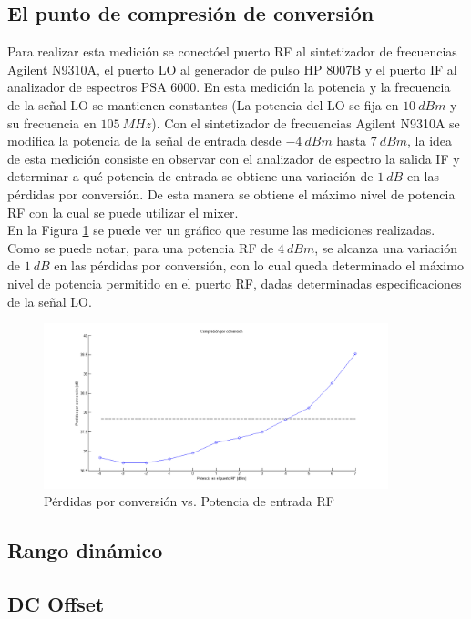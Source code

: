 \documentclass[a4paper,10pt]{article}
\begin{document}
	\subsection{El punto de compresi\'on de conversi\'on}
	\indent Para realizar esta medici\'on se conect\'oel puerto RF al 
	sintetizador de frecuencias Agilent N9310A, el puerto LO al generador de 
	pulso HP 8007B y el puerto IF al analizador de espectros PSA 6000. En esta 
	medici\'on la potencia y la frecuencia de la se\~nal LO se mantienen 
	constantes (La potencia del LO se fija en $10~dBm$ y su frecuencia en 
	$105~MHz$). Con el sintetizador de frecuencias Agilent N9310A se modifica la
	potencia de la se\~nal de entrada desde $-4~dBm$ hasta $7~dBm$, la idea de 
	esta medici\'on consiste en observar con el analizador de espectro la salida
	IF y determinar a qu\'e potencia de entrada se obtiene una variaci\'on de 
	$1~dB$ en las p\'erdidas por conversi\'on. De esta manera se obtiene el 
	m\'aximo nivel de potencia RF con la cual se puede utilizar el mixer. \\
	\indent En la Figura \ref{compresion} se puede ver un gr\'afico que resume 
	las mediciones realizadas. Como se puede notar, para una potencia RF de 
	$4~dBm$, se alcanza una variaci\'on de $1~dB$ en las p\'erdidas por 
	conversi\'on, con lo cual queda determinado el m\'aximo nivel de potencia 
	permitido en el puerto RF, dadas determinadas especificaciones de la se\~nal
	LO.
	
	\begin{figure}[!htb]
		\centering
		\includegraphics[width=10cm]{Images/compresion.png}
		\caption{P\'erdidas por conversi\'on vs. Potencia de entrada RF}
		\label{compresion}
	\end{figure}	
	
	\subsection{Rango din\'amico}
	\subsection{DC Offset}
	\newpage
\end{document}
